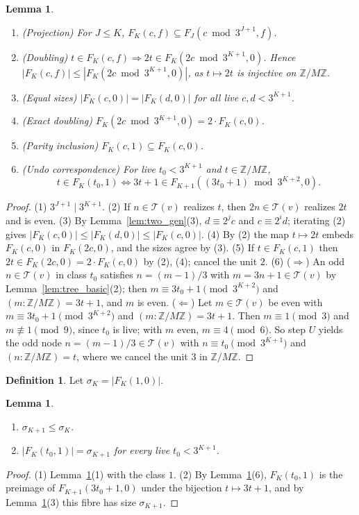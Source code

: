 \documentclass[11pt,reqno,oneside]{amsart}
\theoremstyle{plain}
\newtheorem{lemma}[theorem]{Lemma}
\theoremstyle{definition}
\newtheorem{definition}[theorem]{Definition}
\numberwithin{equation}{section}
\newcommand{\Z}{\mathbb{Z}}
\newcommand{\ZM}{\Z/M\Z}
\newcommand{\Tr}{\mathcal{T}}
\newcommand{\Fib}[3]{F_{#1}(#2,#3)}
\begin{document}
\begin{lemma}\label{lem:fibre_basic}
\leavevmode
\begin{enumerate}[label=(\arabic*), leftmargin=1.8em]
\item (Projection) For $J\le K$, $\Fib Kcf\subseteq\Fib J{c\bmod 3^{J+1}}f$.
\item (Doubling) $t\in\Fib Kcf\Rightarrow 2t\in\Fib K{2c\bmod3^{K+1}}0$. Hence $|\Fib Kcf|\le|\Fib K{2c\bmod 3^{K+1}}0|$, as $t\mapsto2t$ is injective on $\ZM$.
\item (Equal sizes) $|\Fib Kc0|=|\Fib Kd0|$ for all live $c,d<3^{K+1}$.
\item (Exact doubling) $\Fib K{2c\bmod 3^{K+1}}0=2\cdot\Fib Kc0$.
\item (Parity inclusion) $\Fib Kc1\subseteq\Fib Kc0$.
\item (Undo correspondence) For live $t_0<3^{K+1}$ and $t\in\ZM$,
\[
t\in\Fib K{t_0}1\iff 3t+1\in\Fib{K+1}{(3t_0+1)\bmod3^{K+2}}0.
\]
\end{enumerate}
\end{lemma}
\begin{proof}
(1) $3^{J+1}\mid3^{K+1}$. (2) If $n\in\Tr(v)$ realizes $t$, then $2n\in\Tr(v)$ realizes $2t$ and is even. (3) By Lemma~\ref{lem:two_gen}(3), $d\equiv2^jc$ and $c\equiv2^id$; iterating (2) gives $|\Fib Kc0|\le|\Fib Kd0|\le|\Fib Kc0|$. (4) By (2) the map $t\mapsto2t$ embeds $\Fib Kc0$ in $\Fib K{2c}0$, and the sizes agree by (3). (5) If $t\in\Fib Kc1$ then $2t\in\Fib K{2c}0=2\cdot\Fib Kc0$ by (2), (4); cancel the unit $2$. (6) ($\Rightarrow$) An odd $n\in\Tr(v)$ in class $t_0$ satisfies $n=(m-1)/3$ with $m=3n+1\in\Tr(v)$ by Lemma~\ref{lem:tree_basic}(2); then $m\equiv3t_0+1\pmod{3^{K+2}}$ and $(m:\ZM)=3t+1$, and $m$ is even. ($\Leftarrow$) Let $m\in\Tr(v)$ be even with $m\equiv3t_0+1\pmod{3^{K+2}}$ and $(m:\ZM)=3t+1$. Then $m\equiv1\pmod3$ and $m\not\equiv1\pmod 9$, since $t_0$ is live; with $m$ even, $m\equiv4\pmod 6$. So step $U$ yields the odd node $n=(m-1)/3\in\Tr(v)$ with $n\equiv t_0\pmod{3^{K+1}}$ and $(n:\ZM)=t$, where we cancel the unit $3$ in $\ZM$.
\end{proof}

\begin{definition}
Let $\sigma_K=|\Fib K10|$.
\end{definition}

\begin{lemma}\label{lem:sigma}
\leavevmode
\begin{enumerate}[label=(\arabic*), leftmargin=1.8em]
\item $\sigma_{K+1}\le\sigma_K$.
\item $|\Fib K{t_0}1|=\sigma_{K+1}$ for every live $t_0<3^{K+1}$.
\end{enumerate}
\end{lemma}
\begin{proof}
(1) Lemma~\ref{lem:fibre_basic}(1) with the class $1$. (2) By Lemma~\ref{lem:fibre_basic}(6), $\Fib K{t_0}1$ is the preimage of $\Fib{K+1}{3t_0+1}0$ under the bijection $t\mapsto3t+1$, and by Lemma~\ref{lem:fibre_basic}(3) this fibre has size $\sigma_{K+1}$.
\end{proof}
\end{document}
